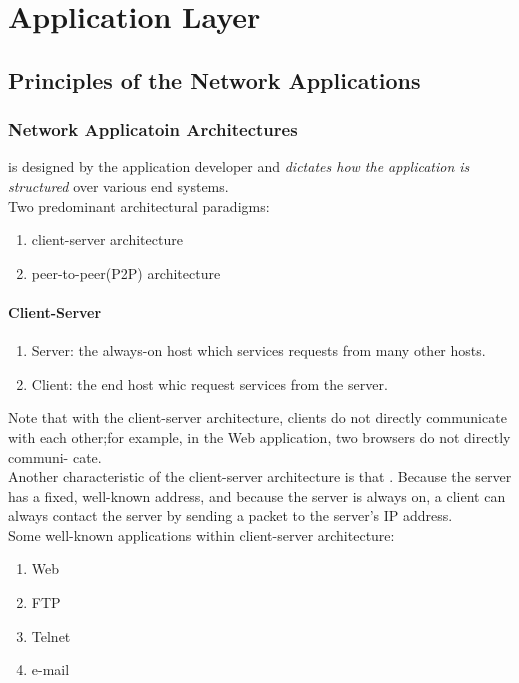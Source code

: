 \chapter{Application Layer}




\section{Principles of the Network Applications}

\subsection{Network Applicatoin Architectures}

\hf{} is designed by the application developer and \textit{dictates how the application is structured} over
various end systems.\\

Two predominant architectural paradigms:
\begin{enumerate}
    \item client-server architecture
    \item peer-to-peer(P2P) architecture
\end{enumerate}

\subsubsection{Client-Server}

\begin{enumerate}
    \item Server: the always-on host which services requests from many other hosts.
    \item Client: the end host whic request services from the server.
\end{enumerate}

Note that with the client-server architecture, clients do not directly communicate with each
other;for example, in the Web application, two browsers do not directly communi-
cate.\\
Another characteristic of the client-server architecture is that . Because
the server has a fixed, well-known address, and because the server is always on, a
client can always contact the server by sending a packet to the server’s IP address.\\
Some well-known applications within client-server architecture:
\begin{enumerate}
    \item Web
    \item FTP
    \item Telnet
    \item e-mail
\end{enumerate}



